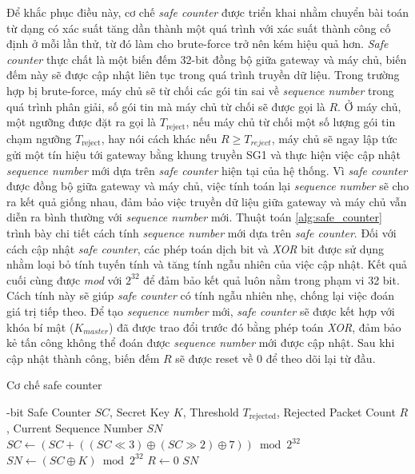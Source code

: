Để khắc phục điều này, cơ chế \textit{safe counter} được triển khai nhằm chuyển bài toán từ dạng có xác suất tăng dần thành một quá trình với xác suất thành công cố định ở mỗi lần thử, từ đó làm cho brute-force trở nên kém hiệu quả hơn. \textit{Safe counter} thực chất là một biến đếm 32-bit đồng bộ giữa gateway và máy chủ, biến đếm này sẽ được cập nhật liên tục trong quá trình truyền dữ liệu. Trong trường hợp bị brute-force, máy chủ sẽ từ chối các gói tin sai về \textit{sequence number} trong quá trình phân giải, số gói tin mà máy chủ từ chối sẽ được gọi là $R$. Ở máy chủ, một ngưỡng được đặt ra gọi là \(T_{\text{reject}} \), nếu máy chủ từ chối một số lượng gói tin chạm ngưỡng \(T_{\text{reject}} \), hay nói cách khác nếu $R \geq T_{reject}$, máy chủ sẽ ngay lập tức gửi một tín hiệu tới gateway bằng khung truyền SG1 và thực hiện việc cập nhật \textit{sequence number} mới dựa trên \textit{safe counter} hiện tại của hệ thống. Vì \textit{safe counter} được đồng bộ giữa gateway và máy chủ, việc tính toán lại \textit{sequence number} sẽ cho ra kết quả giống nhau, đảm bảo việc truyền dữ liệu giữa gateway và máy chủ vẫn diễn ra bình thường với \textit{sequence number} mới. Thuật toán \ref{alg:safe_counter} trình bày chi tiết cách tính \textit{sequence number} mới dựa trên \textit{safe counter}.
Đối với cách cập nhật \textit{safe counter}, các phép toán dịch bit và \textit{XOR} bit được sử dụng nhằm loại bỏ tính tuyến tính và tăng tính ngẫu nhiên của việc cập nhật. Kết 
quả cuối cùng được \textit{mod} với $2^{32}$ để đảm bảo kết quả luôn nằm trong phạm vi 32 bit. Cách tính này sẽ giúp \textit{safe counter} có tính ngẫu nhiên nhẹ, chống lại
việc đoán giá trị tiếp theo. Để tạo \textit{sequence number} mới, \textit{safe counter} sẽ được kết hợp với khóa bí mật ($K_{master}$) đã được trao đổi trước đó bằng phép toán \textit{XOR},
đảm bảo kẻ tấn công không thể đoán được \textit{sequence number} mới được cập nhật. Sau khi cập nhật thành công, biến đếm $R$ sẽ được reset về 0 để theo dõi lại từ đầu.
\begin{algorithm}[ht]
\caption{Cơ chế safe counter}
\small
\label{alg:safe_counter}
\begin{algorithmic}[1]
-bit Safe Counter $SC$, Secret Key $K$, Threshold $T_{\text{rejected}}$, Rejected Packet Count $R$, Current Sequence Number $SN$
\State $SC \gets (SC + ((SC \ll 3) \oplus (SC \gg 2) \oplus 7)) \bmod 2^{32}$
    \State $SN \gets (SC \oplus K) \bmod 2^{32}$
    \State $R \gets 0$
\EndIf
\Return $SN$
\end{algorithmic}
\end{algorithm}

